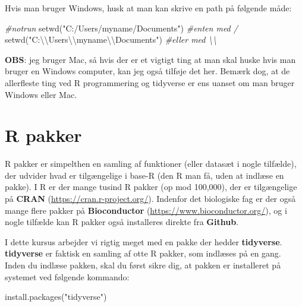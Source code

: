 \documentclass[
]{book}
\newenvironment{Shaded}{\begin{snugshade}}{\end{snugshade}}
\newcommand{\CommentTok}[1]{\textcolor[rgb]{0.56,0.35,0.01}{\textit{#1}}}
\newcommand{\FunctionTok}[1]{\textcolor[rgb]{0.00,0.00,0.00}{#1}}
\newcommand{\NormalTok}[1]{#1}
\newcommand{\SpecialCharTok}[1]{\textcolor[rgb]{0.00,0.00,0.00}{#1}}
\newcommand{\StringTok}[1]{\textcolor[rgb]{0.31,0.60,0.02}{#1}}
\begin{document}
Hvis man bruger Windows, husk at man kan skrive en path på følgende måde:

\begin{Shaded}
\begin{Highlighting}[]
\CommentTok{\#notrun}
\FunctionTok{setwd}\NormalTok{(}\StringTok{"C:/Users/myname/Documents"}\NormalTok{) }\CommentTok{\#enten med /}
\FunctionTok{setwd}\NormalTok{(}\StringTok{"C:}\SpecialCharTok{\textbackslash{}\textbackslash{}}\StringTok{Users}\SpecialCharTok{\textbackslash{}\textbackslash{}}\StringTok{myname}\SpecialCharTok{\textbackslash{}\textbackslash{}}\StringTok{Documents"}\NormalTok{) }\CommentTok{\#eller med \textbackslash{}\textbackslash{}}
\end{Highlighting}
\end{Shaded}

\textbf{OBS}: jeg bruger Mac, så hvis der er et vigtigt ting at man skal huske hvis man bruger en Windows computer, kan jeg også tilføje det her. Bemærk dog, at de allerfleste ting ved R programmering og tidyverse er ens uanset om man bruger Windows eller Mac.

\hypertarget{r-pakker}{%
\section{R pakker}\label{r-pakker}}

R pakker er simpelthen en samling af funktioner (eller datasæt i nogle tilfælde), der udvider hvad er tilgængelige i base-R (den R man få, uden at indlæse en pakke). I R er der mange tusind R pakker (op mod 100,000), der er tilgængelige på \textbf{CRAN} (\url{https://cran.r-project.org/}). Indenfor det biologiske fag er der også mange flere pakker på \textbf{Bioconductor} (\url{https://www.bioconductor.org/}), og i nogle tilfælde kan R pakker også installeres direkte fra \textbf{Github}.

I dette kursus arbejder vi rigtig meget med en pakke der hedder \textbf{tidyverse}. \textbf{tidyverse} er faktisk en samling af otte R pakker, som indlæses på en gang. Inden du indlæse pakken, skal du først sikre dig, at pakken er installeret på systemet ved følgende kommando:

\begin{Shaded}
\begin{Highlighting}[]
\FunctionTok{install.packages}\NormalTok{(}\StringTok{"tidyverse"}\NormalTok{)}
\end{Highlighting}
\end{Shaded}
\end{document}
